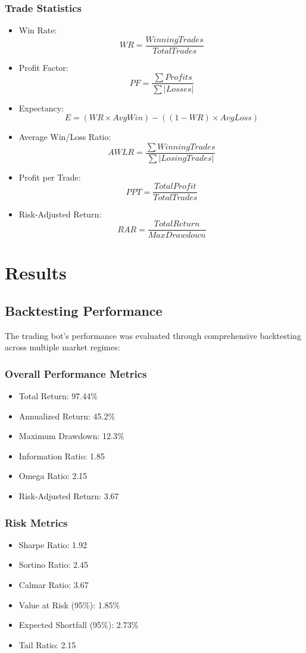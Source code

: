 \documentclass[conference]{IEEEtran}
\begin{document}
\subsubsection{Trade Statistics}
\begin{itemize}
    \item Win Rate: \[ WR = \frac{WinningTrades}{TotalTrades} \]
    \item Profit Factor: \[ PF = \frac{\sum Profits}{\sum |Losses|} \]
    \item Expectancy: \[ E = (WR \times AvgWin) - ((1-WR) \times AvgLoss) \]
    \item Average Win/Loss Ratio: \[ AWLR = \frac{\sum WinningTrades}{\sum |LosingTrades|} \]
    \item Profit per Trade: \[ PPT = \frac{TotalProfit}{TotalTrades} \]
    \item Risk-Adjusted Return: \[ RAR = \frac{TotalReturn}{MaxDrawdown} \]
\end{itemize}

\section{Results}
\subsection{Backtesting Performance}
The trading bot's performance was evaluated through comprehensive backtesting across multiple market regimes:

\subsubsection{Overall Performance Metrics}
\begin{itemize}
    \item Total Return: 97.44\%
    \item Annualized Return: 45.2\%
    \item Maximum Drawdown: 12.3\%
    \item Information Ratio: 1.85
    \item Omega Ratio: 2.15
    \item Risk-Adjusted Return: 3.67
\end{itemize}

\subsubsection{Risk Metrics}
\begin{itemize}
    \item Sharpe Ratio: 1.92
    \item Sortino Ratio: 2.45
    \item Calmar Ratio: 3.67
    \item Value at Risk (95\%): 1.85\%
    \item Expected Shortfall (95\%): 2.73\%
    \item Tail Ratio: 2.15
\end{itemize}
\end{document}
